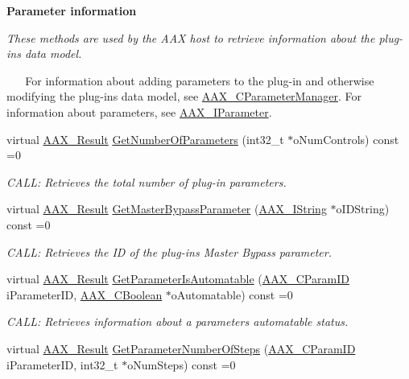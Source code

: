 \begin{Indent}{\bf Parameter information}\par
{\em These methods are used by the A\+A\+X host to retrieve information about the plug-\/in\textquotesingle{}s data model.

~\newline
 ~\newline
 For information about adding parameters to the plug-\/in and otherwise modifying the plug-\/in\textquotesingle{}s data model, see \hyperlink{a00034}{A\+A\+X\+\_\+\+C\+Parameter\+Manager}. For information about parameters, see \hyperlink{a00108}{A\+A\+X\+\_\+\+I\+Parameter}. }\begin{DoxyCompactItemize}
\item 
virtual \hyperlink{a00149_a4d8f69a697df7f70c3a8e9b8ee130d2f}{A\+A\+X\+\_\+\+Result} \hyperlink{a00061_a8af398b1e308849464aee5a6713a3965}{Get\+Number\+Of\+Parameters} (int32\+\_\+t $\ast$o\+Num\+Controls) const =0
\begin{DoxyCompactList}\small\item\em C\+A\+L\+L\+: Retrieves the total number of plug-\/in parameters. \end{DoxyCompactList}\item 
virtual \hyperlink{a00149_a4d8f69a697df7f70c3a8e9b8ee130d2f}{A\+A\+X\+\_\+\+Result} \hyperlink{a00061_ab967122337b61064492024f8bf695ed4}{Get\+Master\+Bypass\+Parameter} (\hyperlink{a00113}{A\+A\+X\+\_\+\+I\+String} $\ast$o\+I\+D\+String) const =0
\begin{DoxyCompactList}\small\item\em C\+A\+L\+L\+: Retrieves the I\+D of the plug-\/in\textquotesingle{}s Master Bypass parameter. \end{DoxyCompactList}\item 
virtual \hyperlink{a00149_a4d8f69a697df7f70c3a8e9b8ee130d2f}{A\+A\+X\+\_\+\+Result} \hyperlink{a00061_a4e6eeef25a797ea4c6961df45174b169}{Get\+Parameter\+Is\+Automatable} (\hyperlink{a00149_a1440c756fe5cb158b78193b2fc1780d1}{A\+A\+X\+\_\+\+C\+Param\+I\+D} i\+Parameter\+I\+D, \hyperlink{a00149_aa216506530f1d19a2965931ced2b274b}{A\+A\+X\+\_\+\+C\+Boolean} $\ast$o\+Automatable) const =0
\begin{DoxyCompactList}\small\item\em C\+A\+L\+L\+: Retrieves information about a parameter\textquotesingle{}s automatable status. \end{DoxyCompactList}\item 
virtual \hyperlink{a00149_a4d8f69a697df7f70c3a8e9b8ee130d2f}{A\+A\+X\+\_\+\+Result} \hyperlink{a00061_a2a8d8d200383204db9bb780a4cc8ef6f}{Get\+Parameter\+Number\+Of\+Steps} (\hyperlink{a00149_a1440c756fe5cb158b78193b2fc1780d1}{A\+A\+X\+\_\+\+C\+Param\+I\+D} i\+Parameter\+I\+D, int32\+\_\+t $\ast$o\+Num\+Steps) const =0

\end{DoxyCompactItemize}
\end{Indent}
